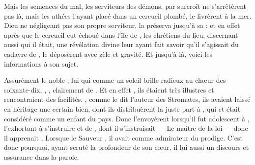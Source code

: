 Mais les semences du mal, les serviteurs des démons, par surcroît ne s'arrêtèrent pas là,
mais les athées l'ayant placé dans un cercueil plombé, le livrèrent à la mer.
Dieu ne négligeant pas son propre serviteur,
la préserva jusqu'à sa  : %
et en effet après que  le cercueil eut échoué dans l'île de ,
les chrétiens du lieu, discernant aussi qui il était,
une révélation divine leur ayant fait savoir qu'il s'agissait du cadavre de ,
le déposèrent avec zèle et gravité.
Et jusqu'à là, voici les informations à son sujet.

Assurément le noble , lui qui comme un soleil brille radieux au chœur des soixante-dix,
, 
,
clairement
de . 
Et en effet , %
ils étaient très illustres et rencontraient des facilités.
, comme le dit  l'auteur des Stromates,
ils avaient laissé en héritage  une certain bien,
dont ils distribuèrent la juste part à , %
qui  et était considéré comme un enfant du pays.
Donc   l'envoyèrent lorsqu'il fut adolescent à ,
l'exhortant à s'instruire  et de ,
dont il s'instruisait  --- Le maître de la loi --- 
 donc il apprenait , 
Lorsque le Sauveur , il avait  comme admirateur du prodige.  
C'est donc pourquoi, ayant scruté la profondeur de son cœur, il lui  aussi un discours et assurance dans la parole.


